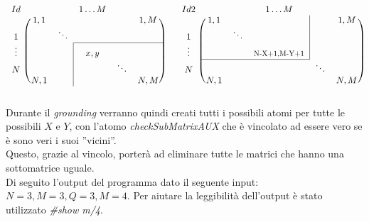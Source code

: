 \documentclass{article}
\begin{document}
\[
  \begin{blockarray}{cccccc}
   Id  &   &   & 1 \dots M   &   &   \\
  \begin{block}{c\Left{}{(\mkern1mu}ccccc<{\mkern1mu})}
     & 1,1   &         &   &   & 1,M   \\
   1 &       & \ddots  &   &   &   \\
  \cline{4-6}
  \begin{block*}{c(cc|ccc)}
   \vdots       &   &   & x,y &          \\
   N  &   &   &     & \ddots  &      \\
           & N,1   &   &     &   & N,M  \\
  \end{block*}
  \end{block}
  \end{blockarray}
  \;\;\;\;\;
    \begin{blockarray}{cccccc}
   Id2  &   &   & 1 \dots M   &   &   \\
  \begin{block}{c\Left{}{(\mkern1mu}ccccc<{\mkern1mu})}
   \begin{block*}{c(ccc|cc)}
          & 1,1   &   &  & & 1,M        \\
   1  &   & \ddots  &     &   &      \\
   \vdots &    &   &  \resizebox{2cm}{!}{N-X+1,M-Y+1}   &   &   \\
  \end{block*}
  \cline{2-4}
   N  &    &         &   & \ddots   &    \\
    & N,1      &  &   &   &  N,M \\
  \end{block}
  \end{blockarray}  
\]

Durante il \textit{grounding} verranno quindi creati tutti i possibili atomi per tutte le possibili $X$ e $Y$, con l'atomo \textit{checkSubMatrixAUX} che è vincolato ad essere vero se è sono veri i suoi ''vicini''.\\
Questo, grazie al vincolo, porterà ad eliminare tutte le matrici che hanno una sottomatrice uguale.\\

Di seguito l'output del programma dato il seguente input: $N=3, M=3, Q=3, M=4$. Per aiutare la leggibilità dell'output è stato utilizzato \textit{\#show m/4}.
\end{document}
